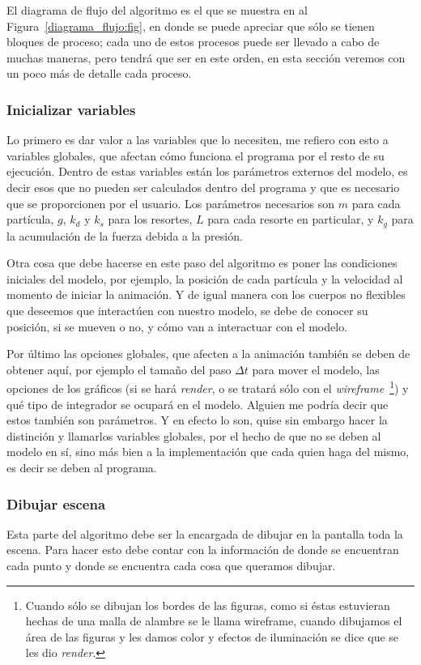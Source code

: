 El diagrama de flujo del algoritmo es el que se muestra en al Figura~\ref{diagrama_flujo:fig}, en donde se puede apreciar que sólo se tienen bloques de proceso; cada uno de estos procesos puede ser llevado a cabo de muchas maneras, pero tendrá que ser en este orden, en esta sección veremos con un poco más de detalle cada proceso.

\subsubsection{Inicializar variables}
Lo primero es dar valor a las variables que lo necesiten, me refiero con esto a variables globales, que afectan cómo funciona el programa por el resto de su ejecución.
Dentro de estas variables están los parámetros externos del modelo, es decir esos que no pueden ser calculados dentro del programa y que es necesario que se proporcionen por el usuario.
Los parámetros necesarios son $m$ para cada partícula, $g$, $k_d$ y $k_s$ para los resortes, $L$ para cada resorte en particular, y $k_g$ para la acumulación de la fuerza debida a la presión.

Otra cosa que debe hacerse en este paso del algoritmo es poner las condiciones iniciales del modelo, por ejemplo, la posición de cada partícula y la velocidad al momento de iniciar la animación.
Y de igual manera con los cuerpos no flexibles que deseemos que interactúen con nuestro modelo, se debe de conocer su posición, si se mueven o no, y cómo van a interactuar con el modelo.

Por último las opciones globales, que afecten a la animación también se deben de obtener aquí, por ejemplo el tamaño del paso $\Delta t$ para mover el modelo, las opciones de los gráficos (si se hará \emph{\textenglish{render}}, o se tratará sólo con el \emph{\textenglish{wireframe}}~\footnote{Cuando sólo se dibujan los bordes de las figuras, como si éstas estuvieran hechas de una malla de alambre se le llama wireframe, cuando dibujamos el área de las figuras y les damos color y efectos de iluminación se dice que se les dio \emph{render}.}) y qué tipo de integrador se ocupará en el modelo.
Alguien me podría decir que estos también son parámetros.
Y en efecto lo son, quise sin embargo hacer la distinción y llamarlos variables globales, por el hecho de que no se deben al modelo en sí, sino más bien a la implementación que cada quien haga del mismo, es decir se deben al programa.

\subsubsection{Dibujar escena}
Esta parte del algoritmo debe ser la encargada de dibujar en la pantalla toda la escena.
Para hacer esto debe contar con la información de donde se encuentran cada punto y donde se encuentra cada cosa que queramos dibujar.

